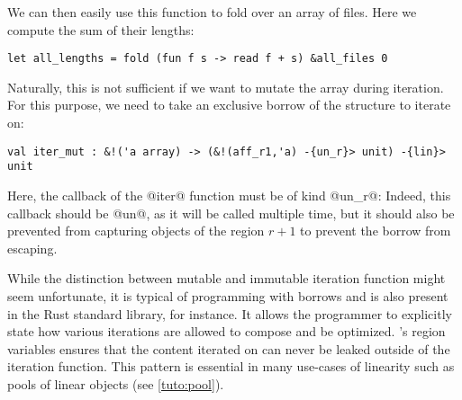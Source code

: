We can then easily use this function to fold over an array of files. Here
we compute the sum of their lengths:

\begin{lstlisting}
let all_lengths = fold (fun f s -> read f + s) &all_files 0 
\end{lstlisting}

Naturally, this is not sufficient if we want to mutate the array during iteration.
For this purpose, we need to take an exclusive borrow of the structure to iterate
on:

\begin{lstlisting}
val iter_mut : &!('a array) -> (&!(aff_r1,'a) -{un_r}> unit) -{lin}> unit
\end{lstlisting}

Here, the callback of the @iter@ function must be of kind @un_r@: Indeed, this
callback should be @un@, as it will be called multiple time, but it should also
be prevented from capturing objects of the region $r+1$ to prevent the borrow
from escaping.

While the distinction between mutable and immutable iteration function
might seem unfortunate, it is typical of
programming with borrows and is also present in the Rust standard library, for
instance. It allows the programmer to explicitly state how various iterations
are allowed to compose and be optimized.
\lang's region variables ensures that the content iterated on can never
be leaked outside of the iteration function.
This pattern is essential in many use-cases of linearity such
as pools of linear objects (see \cref{tuto:pool}). 

\lstDeleteShortInline@

